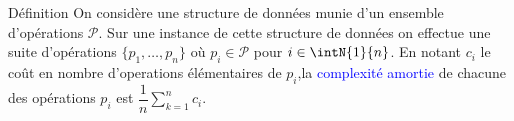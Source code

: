 \documentclass[10pt]{beamer}
\begin{document}
\begin{frame}[fragile]{\Ctitle}{\stitle}
    \begin{alertblock}{Définition}
        On considère une structure de données munie d'un ensemble d'opérations $\mathcal{P}$. Sur une instance de cette structure de données on effectue une suite d'opérations $\{p_1, \dots, p_n\}$ où $p_i \in \mathcal{P}$ pour $i \in \intN{1}{n}$.
        En notant $c_i$ le coût en nombre d'operations élémentaires de $p_i$,la \textcolor{blue}{complexité amortie} de chacune des opérations $p_i$ est  $\displaystyle\dfrac{1}{n}{\sum_{k=1}^n c_i}$.
    \end{alertblock}
\end{frame}
\end{document}
